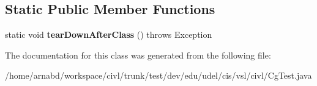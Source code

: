 \subsection*{Static Public Member Functions}
\begin{DoxyCompactItemize}
\item 
\hypertarget{classedu_1_1udel_1_1cis_1_1vsl_1_1civl_1_1CgTest_abe944403083f361c7ffe965048913a28}{}static void {\bfseries tear\+Down\+After\+Class} ()  throws Exception \label{classedu_1_1udel_1_1cis_1_1vsl_1_1civl_1_1CgTest_abe944403083f361c7ffe965048913a28}

\end{DoxyCompactItemize}


The documentation for this class was generated from the following file\+:\begin{DoxyCompactItemize}
\item 
/home/arnabd/workspace/civl/trunk/test/dev/edu/udel/cis/vsl/civl/Cg\+Test.\+java\end{DoxyCompactItemize}
